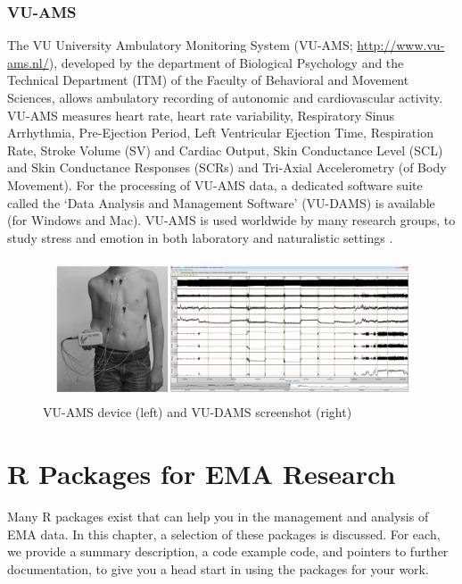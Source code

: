 \documentclass[]{book}
\begin{document}
\subsection{VU-AMS}\label{vu-ams}

 

The VU University Ambulatory Monitoring System (VU-AMS;
\url{http://www.vu-ams.nl/}), developed by the department of Biological
Psychology and the Technical Department (ITM) of the Faculty of
Behavioral and Movement Sciences, allows ambulatory recording of
autonomic and cardiovascular activity. VU-AMS measures heart rate, heart
rate variability, Respiratory Sinus Arrhythmia, Pre-Ejection Period,
Left Ventricular Ejection Time, Respiration Rate, Stroke Volume (SV) and
Cardiac Output, Skin Conductance Level (SCL) and Skin Conductance
Responses (SCRs) and Tri-Axial Accelerometry (of Body Movement). For the
processing of VU-AMS data, a dedicated software suite called the `Data
Analysis and Management Software' (VU-DAMS) is available (for Windows
and Mac). VU-AMS is used worldwide by many research groups, to study
stress and emotion in both laboratory and naturalistic settings
\citep{DeGeus1995, Geus1996, Willemsen1996}.

\begin{figure}[!t]

{\centering \includegraphics[width=1\linewidth]{images/instruments/VU-AMS/VU_AMS2} 

}

\caption{VU-AMS device (left) and VU-DAMS screenshot (right)}\label{fig:vu-ams}
\end{figure}

\chapter{R Packages for EMA Research}\label{rcat}

Many R packages exist that can help you in the management and analysis
of EMA data. In this chapter, a selection of these packages is
discussed. For each, we provide a summary description, a code example
code, and pointers to further documentation, to give you a head start in
using the packages for your work.
\end{document}
